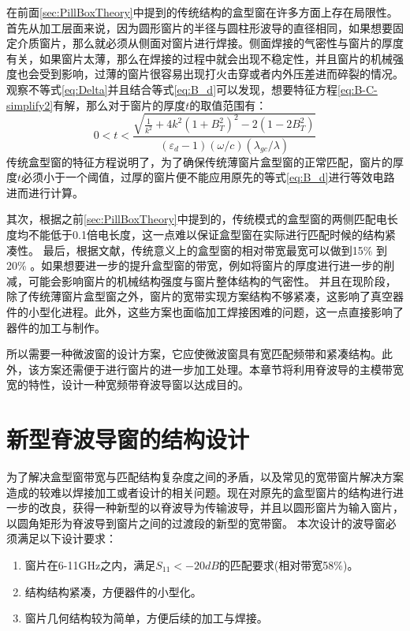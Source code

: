 \documentclass[master]{thesis-uestc}
\begin{document}
在前面\ref{sec:PillBoxTheory}中提到的传统结构的盒型窗在许多方面上存在局限性。首先从加工层面来说，因为圆形窗片的半径与圆柱形波导的直径相同，如果想要固定介质窗片，那么就必须从侧面对窗片进行焊接。侧面焊接的气密性与窗片的厚度有关，如果窗片太薄，那么在焊接的过程中就会出现不稳定性，并且窗片的机械强度也会受到影响，过薄的窗片很容易出现打火击穿或者内外压差进而碎裂的情况。观察不等式\ref{eq:Delta}并且结合等式\ref{eq:B_d}可以发现，想要特征方程\ref{eq:B-C-simplify2}有解，那么对于窗片的厚度$t$的取值范围有：
\begin{equation}\label{eq:t_constraints}
    0 < t < \frac{\sqrt{\frac{1}{k^2}+4k^2(1+B_{T}^2)^2-2(1-2B_{T}^2)}}{(\varepsilon_{d}-1)(\omega / c)(\lambda_{gc} / \lambda)}
\end{equation}
传统盒型窗的特征方程说明了，为了确保传统薄窗片盒型窗的正常匹配，窗片的厚度$t$必须小于一个阈值，过厚的窗片便不能应用原先的等式\ref{eq:B_d}进行等效电路进而进行计算。

其次，根据之前\ref{sec:PillBoxTheory}中提到的，传统模式的盒型窗的两侧匹配电长度均不能低于0.1倍电长度，这一点难以保证盒型窗在实际进行匹配时候的结构紧凑性。
最后，根据文献\cite{huxiongli_bandwidth_pill}，传统意义上的盒型窗的相对带宽最宽可以做到15\% 到20\% 。如果想要进一步的提升盒型窗的带宽，例如将窗片的厚度进行进一步的削减，可能会影响窗片的机械结构强度与窗片整体结构的气密性。
并且在现阶段，除了传统薄窗片盒型窗之外，窗片的宽带实现方案结构不够紧凑，这影响了真空器件的小型化进程。此外，这些方案也面临加工焊接困难的问题，这一点直接影响了器件的加工与制作。

所以需要一种微波窗的设计方案，它应使微波窗具有宽匹配频带和紧凑结构。此外，该方案还需便于进行窗片的进一步加工处理。本章节将利用脊波导的主模带宽宽的特性，设计一种宽频带脊波导窗以达成目的。

\section{新型脊波导窗的结构设计}
为了解决盒型窗带宽与匹配结构复杂度之间的矛盾，以及常见的宽带窗片解决方案造成的较难以焊接加工或者设计的相关问题。现在对原先的盒型窗片的结构进行进一步的改良，获得一种新型的以脊波导为传输波导，并且以圆形窗片为输入窗片，以圆角矩形为脊波导到窗片之间的过渡段的新型的宽带窗。
本次设计的波导窗必须满足以下设计要求：
\begin{enumerate}
    \item 窗片在6-11GHz之内，满足$S_{11}<-20dB$的匹配要求(相对带宽58\%)。
    \item 结构结构紧凑，方便器件的小型化。
    \item 窗片几何结构较为简单，方便后续的加工与焊接。
\end{enumerate}
\end{document}
